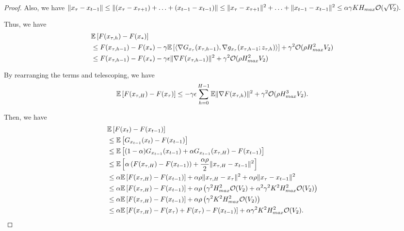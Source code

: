 \documentclass{opt2020} %
\begin{document}
\begin{proof}
Also, we have
$
\|x_\tau - x_{t-1}\|
\leq \|(x_\tau - x_{\tau+1}) + \ldots + (x_{t-1} - x_{t-1})\|
\leq \|x_\tau - x_{\tau+1}\|^2 + \ldots + \|x_{t-1} - x_{t-1}\|^2
\leq \alpha\gamma K H_{max} {\mathcal O}(\sqrt{V_2}).
$

Thus, we have
\begin{align*}
&{\mathbb{E}}\left[ F(x_{\tau, h}) - F(x_*) \right] \\
&\leq F(x_{\tau, h-1}) - F(x_*) - \gamma {\mathbb{E}}\left[  \left\langle \nabla G_{x_\tau}(x_{\tau, h-1}), \nabla g_{x_\tau}(x_{\tau, h-1}; z_{\tau, h}) \right \rangle \right] + \gamma^2 {\mathcal O}(\rho H_{max}^2 V_2) \\
&\leq F(x_{\tau, h-1}) - F(x_*) - \gamma \epsilon \|\nabla F(x_{\tau, h-1})\|^2 + \gamma^2 {\mathcal O}(\rho H_{max}^2 V_2)
\end{align*}

By rearranging the terms and telescoping, we have
\begin{align*}
{\mathbb{E}}\left[ F(x_{\tau, H}) - F(x_{\tau}) \right]  \leq - \gamma \epsilon \sum_{h = 0}^{H-1} {\mathbb{E}} \|\nabla F(x_{\tau, h})\|^2 + \gamma^2 {\mathcal O}(\rho H_{max}^3 V_2).
\end{align*}

Then, we have
\begin{align*}
&{\mathbb{E}}\left[ F(x_t) - F(x_{t-1}) \right] \\
&\leq {\mathbb{E}}\left[ G_{x_{t-1}}(x_t) - F(x_{t-1}) \right] \\
&\leq {\mathbb{E}}\left[ (1-\alpha) G_{x_{t-1}}(x_{t-1}) + \alpha G_{x_{t-1}}(x_{\tau, H}) - F(x_{t-1}) \right] \\
&\leq {\mathbb{E}}\left[ \alpha \left( F(x_{\tau, H})  - F(x_{t-1}) \right) + \frac{\alpha \rho}{2} \| x_{\tau, H} - x_{t-1} \|^2 \right] \\
&\leq \alpha {\mathbb{E}}\left[  F(x_{\tau, H})  - F(x_{t-1}) \right] + \alpha \rho \| x_{\tau, H} - x_{\tau} \|^2 + \alpha \rho \| x_{\tau} - x_{t-1} \|^2  \\
&\leq \alpha {\mathbb{E}}\left[  F(x_{\tau, H})  - F(x_{t-1}) \right] + \alpha \rho \left(\gamma^2 H_{max}^2 {\mathcal O}(V_2) +  \alpha^2\gamma^2 K^2 H_{max}^2 {\mathcal O}(V_2)\right) \\
&\leq \alpha {\mathbb{E}}\left[  F(x_{\tau, H})  - F(x_{t-1}) \right] + \alpha \rho \left(\gamma^2 K^2 H_{max}^2 {\mathcal O}(V_2) \right) \\
&\leq \alpha {\mathbb{E}}\left[  F(x_{\tau, H}) - F(x_{\tau}) + F(x_{\tau})  - F(x_{t-1}) \right] + \alpha \gamma^2 K^2 H_{max}^2 {\mathcal O}(V_2).
\end{align*}


\end{proof}
\end{document}
